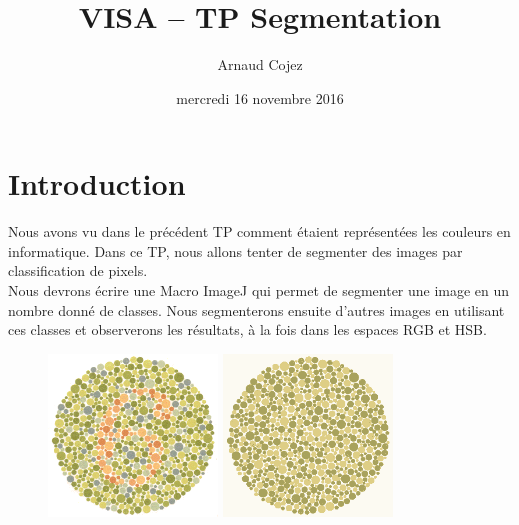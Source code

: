 \documentclass[a4paper]{article}
\begin{document}
\title{VISA -- TP Segmentation}
\author{Arnaud Cojez}
\date{mercredi 16 novembre 2016}

\maketitle

\newpage
\tableofcontents
\newpage

\section{Introduction}

Nous avons vu dans le précédent TP comment étaient représentées les couleurs en informatique. Dans ce TP, nous allons tenter de segmenter des images par classification de pixels.\\

Nous devrons écrire une Macro ImageJ qui permet de segmenter une image en un nombre donné de classes. Nous segmenterons ensuite d'autres images en utilisant ces classes et observerons les résultats, à la fois dans les espaces RGB et HSB.

\begin{figure}[H]
\begin{center}
\includegraphics[width=170px]{../base/cas_4_dalton6.png}
\includegraphics[width=170px]{../resultats/cas_4_dalton6_seg.png}
\end{center}
\end{figure}
\end{document}
